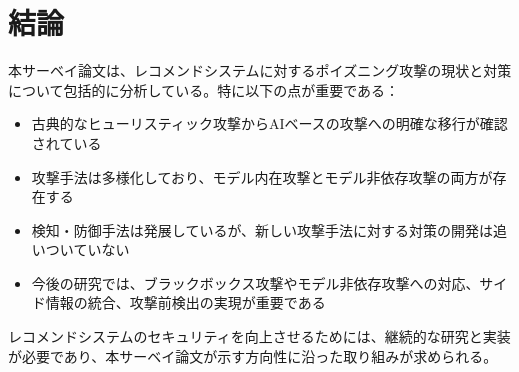 \documentclass[11pt,a4paper]{article}
\begin{document}
\section{結論}

本サーベイ論文は、レコメンドシステムに対するポイズニング攻撃の現状と対策について包括的に分析している。特に以下の点が重要である：

\begin{itemize}
    \item 古典的なヒューリスティック攻撃からAIベースの攻撃への明確な移行が確認されている
    \item 攻撃手法は多様化しており、モデル内在攻撃とモデル非依存攻撃の両方が存在する
    \item 検知・防御手法は発展しているが、新しい攻撃手法に対する対策の開発は追いついていない
    \item 今後の研究では、ブラックボックス攻撃やモデル非依存攻撃への対応、サイド情報の統合、攻撃前検出の実現が重要である
\end{itemize}

レコメンドシステムのセキュリティを向上させるためには、継続的な研究と実装が必要であり、本サーベイ論文が示す方向性に沿った取り組みが求められる。
\end{document}
